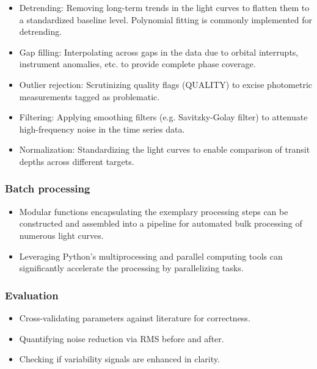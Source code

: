 \documentclass{article}
\begin{document}
\begin{itemize}

    \item Detrending: Removing long-term trends in the light curves to flatten them to a standardized baseline level. Polynomial fitting is commonly implemented for detrending.

    \item Gap filling: Interpolating across gaps in the data due to orbital interrupts, instrument anomalies, etc. to provide complete phase coverage.

    \item Outlier rejection: Scrutinizing quality flags (QUALITY) to excise photometric measurements tagged as problematic.

    \item Filtering: Applying smoothing filters (e.g. Savitzky-Golay filter) to attenuate high-frequency noise in the time series data.

    \item Normalization: Standardizing the light curves to enable comparison of transit depths across different targets.
    
\end{itemize}

\subsubsection{Batch processing}

\begin{itemize}

    \item Modular functions encapsulating the exemplary processing steps can be constructed and assembled into a pipeline for automated bulk processing of numerous light curves.

    \item Leveraging Python's multiprocessing and parallel computing tools can significantly accelerate the processing by parallelizing tasks.
    
\end{itemize}

\subsubsection{Evaluation} 

\begin{itemize}

    \item Cross-validating parameters against literature for correctness.

    \item Quantifying noise reduction via RMS before and after.

    \item Checking if variability signals are enhanced in clarity.
    
\end{itemize}
\end{document}
